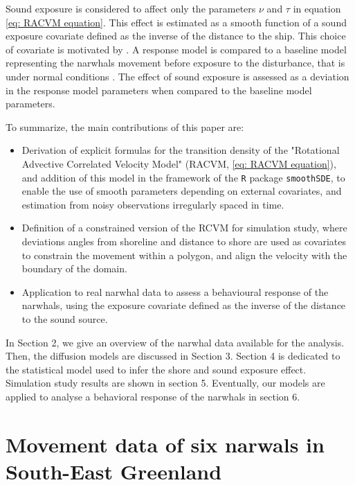 \documentclass[11pt]{article}
\newcommand {\1}{\mathbb{1}}
\theoremstyle{definition}
\theoremstyle{remark}
\theoremstyle{remark}
\begin{document}
Sound exposure is considered to affect only the parameters $\nu$ and $\tau$ in equation \ref{eq: RACVM equation}. This effect is estimated as a smooth function of a sound exposure covariate defined as the inverse of the distance to the ship. This choice of covariate is motivated by \cite{heide-jorgensen_behavioral_2021}. A response model is compared to a baseline model representing the narwhals movement before exposure to the disturbance, that is under normal conditions \cite{michelot_continuous-time_2022}.
The effect of sound exposure is assessed as a deviation in the response model parameters when compared to the baseline model parameters.



To summarize, the main contributions of this paper are:
\begin{itemize}
	\item Derivation of explicit formulas for the transition density of the "Rotational Advective Correlated Velocity Model" (RACVM, \ref{eq: RACVM equation}), and addition of this model in the framework of  the \texttt{R} package \texttt{smoothSDE}, to enable the use of smooth parameters depending on external covariates, and estimation from noisy observations irregularly spaced in time.
	\item Definition of a constrained version of the RCVM for simulation study, where deviations angles from shoreline and distance to shore are used as covariates to constrain the movement within a polygon, and align the velocity with the boundary of the domain.
	\item Application to real narwhal data to assess a behavioural response of the narwhals, using the exposure covariate defined as the inverse of the distance to the sound source.
\end{itemize}

In Section 2, we give an overview of the narwhal data available for the analysis.
Then, the diffusion models are discussed in Section 3. Section 4 is dedicated to the statistical model used to infer the shore and sound exposure effect. Simulation study results are shown in section 5. Eventually, our models are applied to analyse a behavioral response of the narwhals in section 6.





\section{Movement data of six narwals in South-East Greenland}
\end{document}

